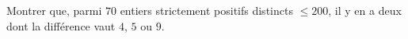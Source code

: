 Montrer que, parmi $70$ entiers strictement positifs distincts $\leq 200$, il y en a deux dont la différence vaut $4$, $5$ ou $9$.
